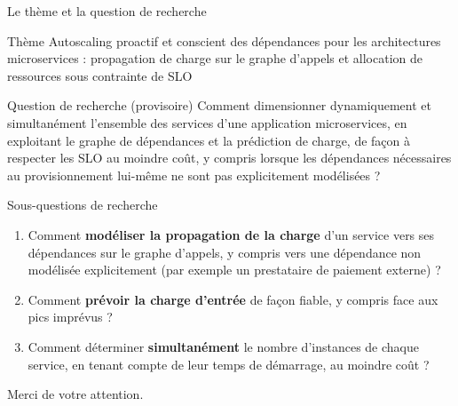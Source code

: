 \documentclass[aspectratio=169,10pt]{beamer}
\begin{document}
\begin{frame}{Le thème et la question de recherche}
  \begin{block}{Thème}
    Autoscaling proactif et conscient des dépendances pour les architectures microservices : propagation de charge sur le graphe d'appels et allocation de ressources sous contrainte de SLO
  \end{block}
  \vspace{0.2cm}
  \begin{alertblock}{Question de recherche (provisoire)}
    Comment dimensionner dynamiquement et simultanément l'ensemble des services d'une application microservices, en exploitant le graphe de dépendances et la prédiction de charge, de façon à respecter les SLO au moindre coût, y compris lorsque les dépendances nécessaires au provisionnement lui-même ne sont pas explicitement modélisées ?
  \end{alertblock}
\end{frame}

\begin{frame}{Sous-questions de recherche}
  \begin{enumerate}
    \item[\textbf{SQ1}] Comment \textbf{modéliser la propagation de la charge} d'un service vers ses dépendances sur le graphe d'appels, y compris vers une dépendance non modélisée explicitement (par exemple un prestataire de paiement externe) ?
    \item[\textbf{SQ2}] Comment \textbf{prévoir la charge d'entrée} de façon fiable, y compris face aux pics imprévus ?
    \item[\textbf{SQ3}] Comment déterminer \textbf{simultanément} le nombre d'instances de chaque service, en tenant compte de leur temps de démarrage, au moindre coût ?
  \end{enumerate}

\end{frame}

\begin{frame}[plain]
  \begin{center}
    \Large
    Merci de votre attention.
  \end{center}
\end{frame}
\end{document}
